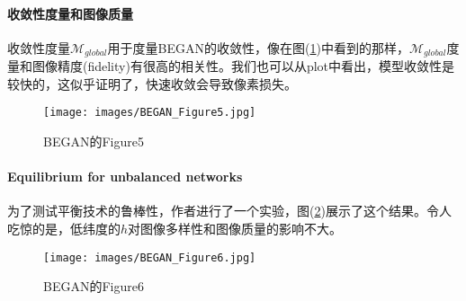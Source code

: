             \paragraph{收敛性度量和图像质量}收敛性度量$\mathcal{M}_{global}$用于度量BEGAN的收敛性，像在图(\ref{fig:BEGAN的Figure5})中看到的那样，$\mathcal{M}_{global}$度量和图像精度(fidelity)有很高的相关性。我们也可以从plot中看出，模型收敛性是较快的，这似乎证明了，快速收敛会导致像素损失。
                \begin{figure}[H]
                \centering
                \texttt{[image: images/BEGAN\_Figure5.jpg]}
                \caption{BEGAN的Figure5}
                \label{fig:BEGAN的Figure5}
                \end{figure}
            \paragraph{Equilibrium for unbalanced networks}为了测试平衡技术的鲁棒性，作者进行了一个实验，图(\ref{fig:BEGAN的Figure6})展示了这个结果。令人吃惊的是，低纬度的$h$对图像多样性和图像质量的影响不大。
                \begin{figure}[H]
                \centering
                \texttt{[image: images/BEGAN\_Figure6.jpg]}
                \caption{BEGAN的Figure6}
                \label{fig:BEGAN的Figure6}
                \end{figure}




% 

